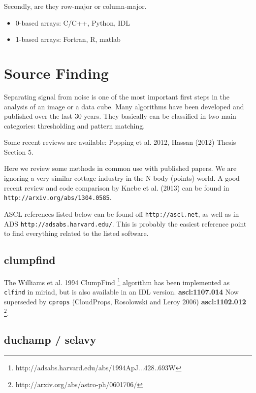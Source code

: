 \documentclass[preprint]{aastex} %
\begin{document}
Secondly, are they row-major or column-major.


\begin{itemize}
\item  
0-based arrays:   C/C++,  Python, IDL
\item
1-based arrays:   Fortran, R, matlab
\end{itemize}

\section{Source Finding}

Separating signal from noise is one of the most important first steps
in the analysis of an image or a data cube. Many algorithms have
been developed and published over the last 30 years. They basically
can be classified in two main  categories:  thresholding and pattern
matching.

Some recent reviews are available:
Popping et al. 2012,  Hassan (2012) Thesis Section 5.   


Here we review some methods in common use with published papers. 
We are ignoring a very similar cottage industry in the N-body (points)
world. A good recent review and code comparison 
by Knebe et al. (2013) can be found
in {\tt http://arxiv.org/abs/1304.0585}.

ASCL references listed below can be found off {\tt http://ascl.net}, as well
as in ADS {\tt http://adsabs.harvard.edu/}. This is probably the easiest
reference point to find everything related to the listed software.

\subsection{clumpfind}

The Williams et al. 1994 
ClumpFind
\footnote{http://adsabs.harvard.edu/abs/1994ApJ...428..693W}
algorithm has been implemented as {\tt clfind}
in miriad, but is also available in an IDL version. 
{\bf ascl:1107.014}
Now superseded
by {\tt cprops} (CloudProps, Rosolowski and Leroy 2006) {\bf ascl:1102.012}
\footnote{http://arxiv.org/abs/astro-ph/0601706/}.



\subsection{duchamp / selavy}
\end{document}
